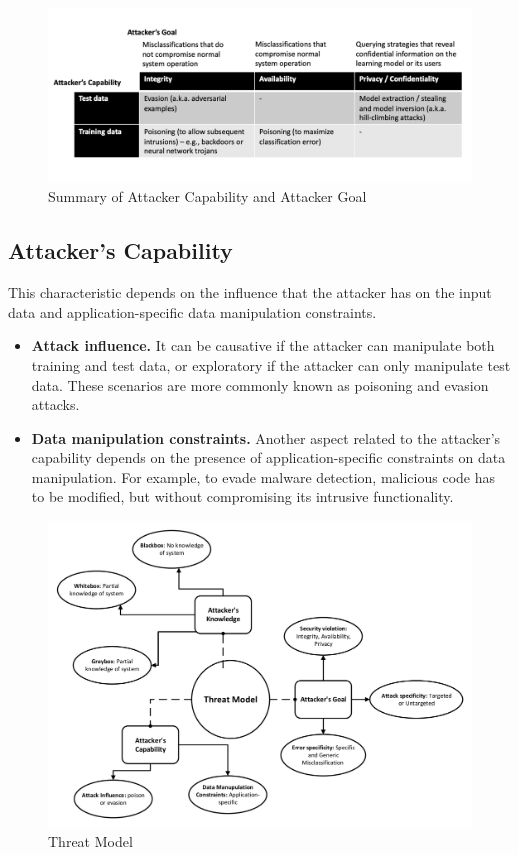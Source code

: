 \documentclass[10pt, conference, a4paper, final]{IEEEtran}
\begin{document}
\begin{figure}[!ht]
\centering
\includegraphics[width=1\textwidth]{proposal_images/attackergoal_capability.png}
\caption{Summary of Attacker Capability and Attacker Goal}
\label{threat model}
\end{figure}
\subsection{Attacker’s Capability}

This characteristic depends on the influence that the attacker has on the input data and application-specific data manipulation constraints.

\begin{itemize}
    \item \textbf{Attack influence.} It can be causative if the attacker can manipulate both training and test data, or exploratory if the attacker can only manipulate test data. These scenarios are more commonly known as poisoning and evasion attacks.
    
    \item \textbf{Data manipulation constraints.} Another aspect related to the attacker’s capability depends on the presence of application-specific constraints on data manipulation. For example, to evade malware detection, malicious code has to be modified, but without compromising its intrusive functionality.
\end{itemize}

\begin{figure}[!ht]
\centering
\includegraphics[width=1\textwidth]{proposal_images/Threatmodel.pdf}
\caption{Threat Model}
\label{threat model}
\end{figure}
\end{document}

